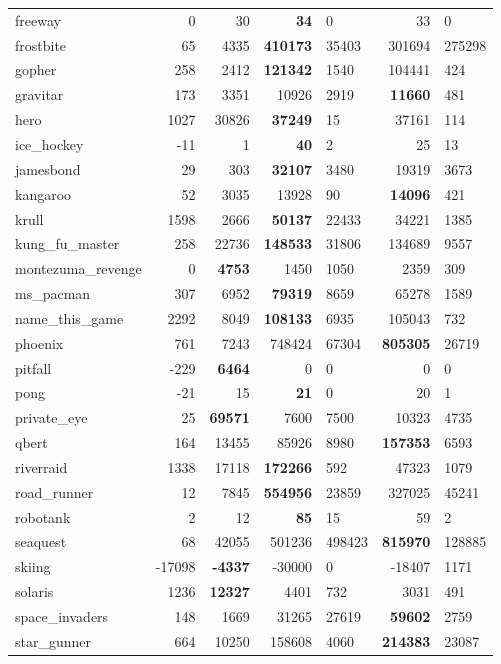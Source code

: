 \documentclass{article}
\begin{document}
\begin{table*}[tb]
\begin{center}
\begin{small}
\begin{tabular}{lrrrlrl}
freeway & 0 & 30 & {\bf 34} & 0 & 33 & 0 \\
frostbite & 65 & 4335 & {\bf 410173} & 35403 & 301694 & 275298 \\
gopher & 258 & 2412 & {\bf 121342} & 1540 & 104441 & 424 \\
gravitar & 173 & 3351 & 10926 & 2919 & {\bf 11660} & 481 \\
hero & 1027 & 30826 & {\bf 37249} & 15 & 37161 & 114 \\
ice\_hockey & -11 & 1 & {\bf 40} & 2 & 25 & 13 \\
jamesbond & 29 & 303 & {\bf 32107} & 3480 & 19319 & 3673 \\
kangaroo & 52 & 3035 & 13928 & 90 & {\bf 14096} & 421 \\
krull & 1598 & 2666 & {\bf 50137} & 22433 & 34221 & 1385 \\
kung\_fu\_master & 258 & 22736 & {\bf 148533} & 31806 & 134689 & 9557 \\
montezuma\_revenge & 0 & {\bf 4753} & 1450 & 1050 & 2359 & 309 \\
ms\_pacman & 307 & 6952 & {\bf 79319} & 8659 & 65278 & 1589 \\
name\_this\_game & 2292 & 8049 & {\bf 108133} & 6935 & 105043 & 732 \\
phoenix & 761 & 7243 & 748424 & 67304 & {\bf 805305} & 26719 \\
pitfall & -229 & {\bf 6464} & 0 & 0 & 0 & 0 \\
pong & -21 & 15 & {\bf 21} & 0 & 20 & 1 \\
private\_eye & 25 & {\bf 69571} & 7600 & 7500 & 10323 & 4735 \\
qbert & 164 & 13455 & 85926 & 8980 & {\bf 157353} & 6593 \\
riverraid & 1338 & 17118 & {\bf 172266} & 592 & 47323 & 1079 \\
road\_runner & 12 & 7845 & {\bf 554956} & 23859 & 327025 & 45241 \\
robotank & 2 & 12 & {\bf 85} & 15 & 59 & 2 \\
seaquest & 68 & 42055 & 501236 & 498423 & {\bf 815970} & 128885 \\
skiing & -17098 & {\bf -4337} & -30000 & 0 & -18407 & 1171 \\
solaris & 1236 & {\bf 12327} & 4401 & 732 & 3031 & 491 \\
space\_invaders & 148 & 1669 & 31265 & 27619 & {\bf 59602} & 2759 \\
star\_gunner & 664 & 10250 & 158608 & 4060 & {\bf 214383} & 23087 \\

\end{tabular}
\end{small}
\end{center}
\end{table*}
\end{document}
